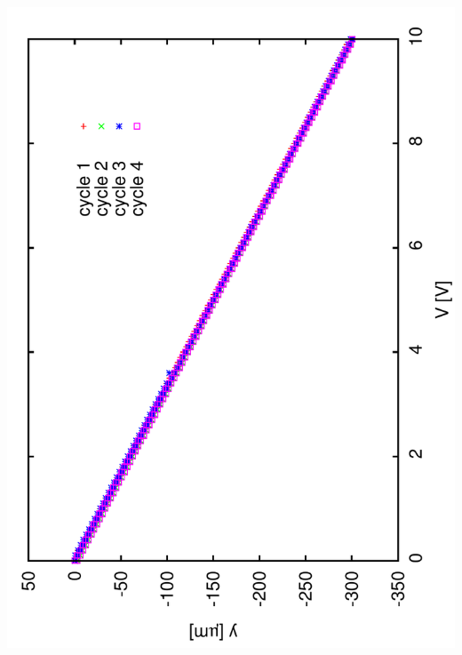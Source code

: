 \documentclass[a4paper,11pt]{book}
\begin{document}
\includegraphics[angle=-90,scale=0.10]{image02.pdf}
\end{document}
